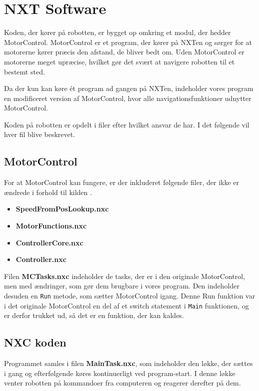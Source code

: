 \section{NXT Software}
Koden, der kører på robotten, er bygget op omkring et modul, der hedder MotorControl. \cite{MotorControl}
MotorControl er et program, der kører på NXTen og sørger for at motorerne kører præcis den afstand, de bliver bedt om. 
Uden MotorControl er motorerne meget upræcise, hvilket gør det svært at navigere robotten til et bestemt sted.

Da der kun kan køre ét program ad gangen på NXTen, indeholder vores program en modificeret version af MotorControl, hvor alle navigationsfunktioner udnytter MotorControl.

Koden på robotten er opdelt i filer efter hvilket ansvar de har.
I det følgende vil hver fil blive beskrevet.

\subsection{MotorControl}
For at MotorControl kan fungere, er der inkluderet følgende filer, der ikke er ændrede i forhold til kilden \cite{MotorControl}.

\begin{itemize}
\item \textbf{SpeedFromPosLookup.nxc}
\item \textbf{MotorFunctions.nxc}
\item \textbf{ControllerCore.nxc}
\item \textbf{Controller.nxc}
\end{itemize}

Filen \textbf{MCTasks.nxc} indeholder de tasks, der er i den originale MotorControl, men med ændringer, som gør dem brugbare i vores program.
Den indeholder desuden en \lstinline[style=c]!Run! metode, som sætter MotorControl igang. 
Denne Run funktion var i det originale MotorControl en del af et switch statement i \lstinline[style=c]!Main! funktionen, og er derfor trukket ud, så det er en funktion, der kan kaldes.

\subsection{NXC koden}

Programmet samles i filen \textbf{MainTask.nxc}, som indeholder den løkke, der sættes i gang og efterfølgende køres kontinuerligt ved program-start. 
I denne løkke venter robotten på kommandoer fra computeren og reagerer derefter på dem.

